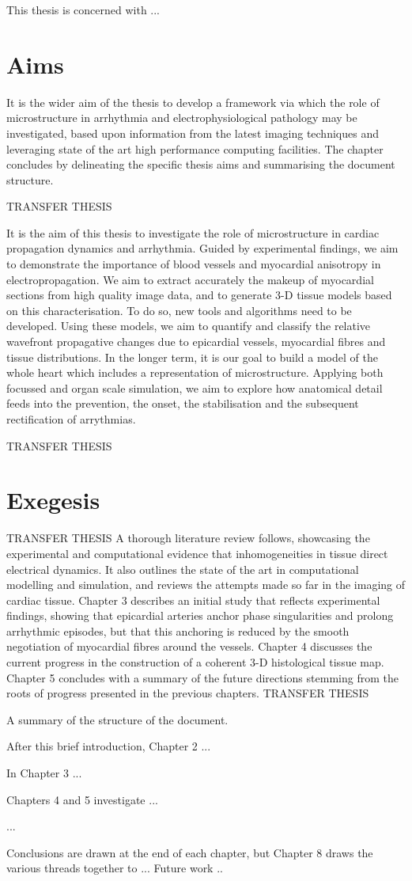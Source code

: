 This thesis is concerned with ...

\section{Aims}
\label{sec:intro:aims}
It is the wider aim of the thesis to develop a framework via which the role of microstructure in arrhythmia and electrophysiological pathology may be investigated, based upon information from the latest imaging techniques and leveraging state of the art high performance computing facilities. The chapter concludes by delineating the specific thesis aims and summarising the document structure.

TRANSFER THESIS


It is the aim of this thesis to investigate the role of microstructure in cardiac propagation dynamics and arrhythmia. Guided by experimental findings, we aim to demonstrate the importance of blood vessels and myocardial anisotropy in electropropagation. We aim to extract accurately the makeup of myocardial sections from high quality image data, and to generate 3-D tissue models based on this characterisation. To do so, new tools and algorithms need to be developed. Using these models, we aim to quantify and classify the relative wavefront propagative changes due to epicardial vessels, myocardial fibres and tissue distributions. In the longer term, it is our goal to build a model of the whole heart which includes a representation of microstructure. Applying both focussed and organ scale simulation, we aim to explore how anatomical detail feeds into the prevention, the onset, the stabilisation and the subsequent rectification of arrythmias.

TRANSFER THESIS

\section{Exegesis}
\label{sec:intro:exegesis}
TRANSFER THESIS
 A thorough literature review follows, showcasing the experimental and computational evidence that inhomogeneities in tissue direct electrical dynamics. It also outlines the state of the art in computational modelling and simulation, and reviews the attempts made so far in the imaging of cardiac tissue. Chapter 3 describes an initial study that reflects experimental findings, showing that epicardial arteries anchor phase singularities and prolong arrhythmic episodes, but that this anchoring is reduced by the smooth negotiation of myocardial fibres around the vessels. Chapter 4 discusses the current progress in the construction of a coherent 3-D histological tissue map. Chapter 5 concludes with a summary of the future directions stemming from the roots of progress presented in the previous chapters.
TRANSFER THESIS


A summary of the structure of the document.

After this brief introduction, Chapter 2 ...

In Chapter 3 ...

Chapters 4 and 5 investigate ...

...

Conclusions are drawn at the end of each chapter,
but Chapter 8 draws the various threads together to ...
Future work ..


